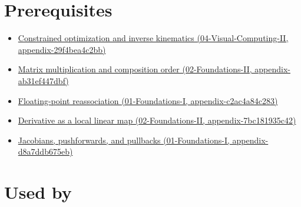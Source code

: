 \section{Prerequisites}\label{appendix-40df0855b4a7-prerequisites}

\begin{itemize}
\tightlist
\item
  \href{../04-Visual-Computing-II/main.pdf\#nameddest=appendix-29f4bea4c2bb}{Constrained optimization and inverse kinematics (04-Visual-Computing-II, appendix-29f4bea4c2bb)}
\item
  \href{../02-Foundations-II/main.pdf\#nameddest=appendix-ab31ef447dbf}{Matrix multiplication and composition order (02-Foundations-II, appendix-ab31ef447dbf)}
\item
  \href{../01-Foundations-I/main.pdf\#nameddest=appendix-c2ac4a84c283}{Floating-point reassociation (01-Foundations-I, appendix-c2ac4a84c283)}
\item
  \href{../02-Foundations-II/main.pdf\#nameddest=appendix-7bc181935c42}{Derivative as a local linear map (02-Foundations-II, appendix-7bc181935c42)}
\item
  \href{../01-Foundations-I/main.pdf\#nameddest=appendix-d8a7ddb675eb}{Jacobians, pushforwards, and pullbacks (01-Foundations-I, appendix-d8a7ddb675eb)}
\end{itemize}

\section{Used by}\label{appendix-40df0855b4a7-used-by}


